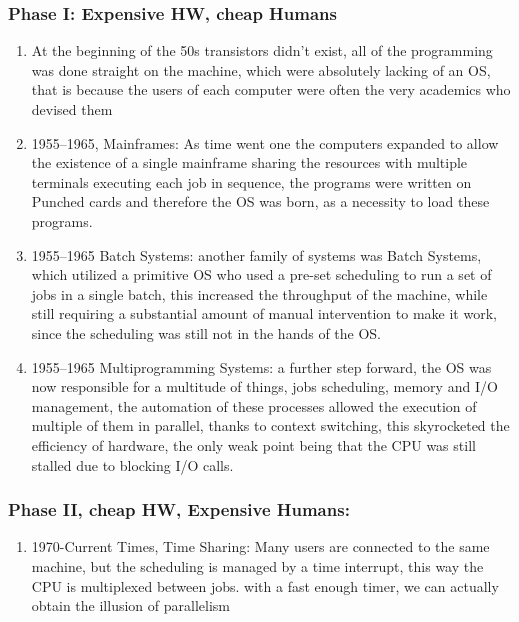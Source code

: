 \documentclass[openright, twoside]{report}
\theoremstyle{definition}
\theoremstyle{example}
\begin{document}
	\subsubsection{Phase I: Expensive HW, cheap Humans}
	\begin{enumerate}
		\item  At the beginning of the 50s
			transistors didn't exist, all of the programming was done straight
			on the machine, which were absolutely lacking of an OS, that is
			because the users of each computer were often the very academics who devised them

		\item 1955--1965, Mainframes: As time went one the computers expanded to allow
			the existence of a single mainframe sharing the resources with multiple terminals
			executing each job in sequence, the programs were written on Punched cards and therefore
			the OS was born, as a necessity to load these programs.

		\item 1955--1965 Batch Systems: another family of systems was Batch Systems, which
			utilized a primitive OS who used a pre-set scheduling to run a set of jobs in a single batch,
			this increased the throughput of the machine, while still requiring a substantial amount of
			manual intervention to make it work, since the scheduling was still not in the hands of the OS.

		\item 1955--1965 Multiprogramming Systems: a further step forward, the OS was now
			responsible for a multitude of things, jobs scheduling, memory and I/O management, the automation
			of these processes allowed the execution of multiple of them in parallel, thanks to context
			switching, this skyrocketed the efficiency of hardware, the only weak point being that
			the CPU was still stalled due to blocking I/O calls.
	\end{enumerate}
	\subsubsection{Phase II, cheap HW, Expensive Humans:}
	\begin{enumerate}
		\label{par:parallel}
		\item 1970-Current Times, Time Sharing: Many users are connected to the same machine, but
			the scheduling is managed by a time interrupt, this way the CPU is multiplexed between jobs.
			with a fast enough timer, we can actually obtain the illusion of parallelism
	\end{enumerate}
\end{document}
